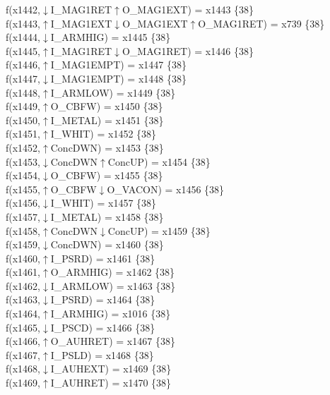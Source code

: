 f(x1442,$\downarrow$I\_MAG1RET$\uparrow$O\_MAG1EXT) = x1443 \{38\} \\  
f(x1443,$\uparrow$I\_MAG1EXT$\downarrow$O\_MAG1EXT$\uparrow$O\_MAG1RET) = x739 \{38\} \\  
f(x1444,$\downarrow$I\_ARMHIG) = x1445 \{38\} \\  
f(x1445,$\uparrow$I\_MAG1RET$\downarrow$O\_MAG1RET) = x1446 \{38\} \\  
f(x1446,$\uparrow$I\_MAG1EMPT) = x1447 \{38\} \\  
f(x1447,$\downarrow$I\_MAG1EMPT) = x1448 \{38\} \\  
f(x1448,$\uparrow$I\_ARMLOW) = x1449 \{38\} \\  
f(x1449,$\uparrow$O\_CBFW) = x1450 \{38\} \\  
f(x1450,$\uparrow$I\_METAL) = x1451 \{38\} \\  
f(x1451,$\uparrow$I\_WHIT) = x1452 \{38\} \\  
f(x1452,$\uparrow$ConcDWN) = x1453 \{38\} \\  
f(x1453,$\downarrow$ConcDWN$\uparrow$ConcUP) = x1454 \{38\} \\  
f(x1454,$\downarrow$O\_CBFW) = x1455 \{38\} \\  
f(x1455,$\uparrow$O\_CBFW$\downarrow$O\_VACON) = x1456 \{38\} \\  
f(x1456,$\downarrow$I\_WHIT) = x1457 \{38\} \\  
f(x1457,$\downarrow$I\_METAL) = x1458 \{38\} \\  
f(x1458,$\uparrow$ConcDWN$\downarrow$ConcUP) = x1459 \{38\} \\  
f(x1459,$\downarrow$ConcDWN) = x1460 \{38\} \\  
f(x1460,$\uparrow$I\_PSRD) = x1461 \{38\} \\  
f(x1461,$\uparrow$O\_ARMHIG) = x1462 \{38\} \\  
f(x1462,$\downarrow$I\_ARMLOW) = x1463 \{38\} \\  
f(x1463,$\downarrow$I\_PSRD) = x1464 \{38\} \\  
f(x1464,$\uparrow$I\_ARMHIG) = x1016 \{38\} \\  
f(x1465,$\downarrow$I\_PSCD) = x1466 \{38\} \\  
f(x1466,$\uparrow$O\_AUHRET) = x1467 \{38\} \\  
f(x1467,$\uparrow$I\_PSLD) = x1468 \{38\} \\  
f(x1468,$\downarrow$I\_AUHEXT) = x1469 \{38\} \\  
f(x1469,$\uparrow$I\_AUHRET) = x1470 \{38\} \\  
